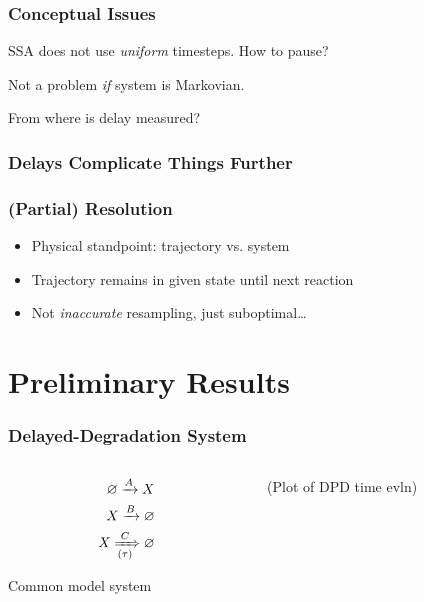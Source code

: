 \documentclass[xcolor={usenames,dvipsnames,svgnames}]{beamer}
\begin{document}
\begin{frame}
    \frametitle{Conceptual Issues}
    SSA does not use \emph{uniform} timesteps. How to pause?

    \begin{center}
        
    \end{center}

    Not a problem \emph{if} system is Markovian.
\end{frame}

\begin{frame}
    From where is delay measured?

    \frametitle{Delays Complicate Things Further}
    \begin{center}
        
    \end{center}
\end{frame}

\begin{frame}
    \frametitle{(Partial) Resolution}
    \begin{itemize}
        \item Physical standpoint: trajectory vs. system
        \item Trajectory remains in given state until next reaction
        \item Not \emph{inaccurate} resampling, just suboptimal\ldots
    \end{itemize}
\end{frame}


\section{Preliminary Results}

\begin{frame}
    \frametitle{Delayed-Degradation System}
    \begin{columns}[c]
        \begin{column}{0.5\textwidth}
            \begin{align*}
                \varnothing \xrightarrow{A} X \\
                X \xrightarrow{B} \varnothing \\
                X \xRightarrow[(\tau)]{C} \varnothing
            \end{align*}

            Common model system
        \end{column}
        \begin{column}{0.5\textwidth}
            (Plot of DPD time evln)
        \end{column}
    \end{columns}
\end{frame}
\end{document}
